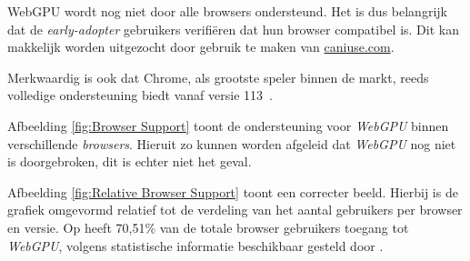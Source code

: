 WebGPU wordt nog niet door alle browsers ondersteund. Het is dus belangrijk dat de \textit{early-adopter} gebruikers verifiëren dat hun browser compatibel is. Dit kan makkelijk worden uitgezocht door gebruik te maken van \href{https://caniuse.com/webgpu}{caniuse.com}.

\bigbreak{}

Merkwaardig is ook dat Chrome, als grootste speler binnen de markt, reeds volledige ondersteuning biedt vanaf versie 113~\autocite{Deveria2024}.

\bigbreak{}

Afbeelding \ref{fig:Browser Support} toont de ondersteuning voor \textit{WebGPU} binnen verschillende \textit{browsers}. Hieruit zo kunnen worden afgeleid dat \textit{WebGPU} nog niet is doorgebroken, dit is echter niet het geval.

\bigbreak{}
\date{}

Afbeelding \ref{fig:Relative Browser Support} toont een correcter beeld. Hierbij is de grafiek omgevormd relatief tot de verdeling van het aantal gebruikers per browser en versie. Op   heeft 70,51\% van de totale browser gebruikers toegang tot \textit{WebGPU}, volgens statistische informatie beschikbaar gesteld door \textcite{Deveria2024}.